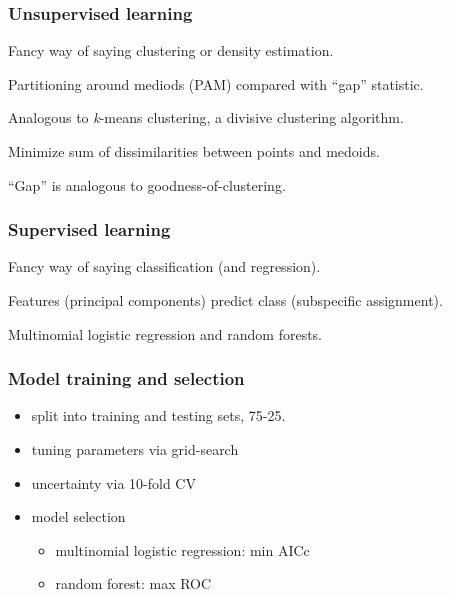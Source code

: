 \documentclass{beamer}\usepackage{graphicx, color}
\begin{document}
\begin{frame}
  \frametitle{Unsupervised learning}

  Fancy way of saying clustering or density estimation.

  Partitioning around mediods (PAM) compared with ``gap'' statistic.

  Analogous to \textit{k}-means clustering, a divisive clustering algorithm.

  Minimize sum of dissimilarities between points and medoids.

  ``Gap'' is analogous to goodness-of-clustering.
  
\end{frame}

\begin{frame}
  \frametitle{Supervised learning}

  Fancy way of saying classification (and regression).

  Features (principal components) predict class (subspecific assignment).

  Multinomial logistic regression and random forests.

\end{frame}

\begin{frame}
  \frametitle{Model training and selection}

  \begin{itemize}
    \item split into training and testing sets, 75-25.
    \item tuning parameters via grid-search
    \item uncertainty via 10-fold CV
    \item model selection
      \begin{itemize}
        \item multinomial logistic regression: min AICc
        \item random forest: max ROC
      \end{itemize}
  \end{itemize}

\end{frame}
\end{document}
